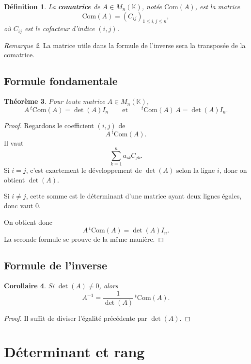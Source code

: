 \documentclass[11pt,a4paper]{article}
\newtheorem{definition}{Définition}[section]
\newtheorem{theoreme}[definition]{Théorème}
\newtheorem{corollaire}[definition]{Corollaire}
\theoremstyle{remark}
\newtheorem{remarque}[definition]{Remarque}
\newcommand{\K}{\mathbb{K}}
\begin{document}
\begin{definition}
La \textbf{comatrice} de \(A\in M_n(\K)\), notée \(\mathrm{Com}(A)\), est la matrice
\[
\mathrm{Com}(A)=(C_{ij})_{1\le i,j\le n},
\]
où \(C_{ij}\) est le cofacteur d’indice \((i,j)\).
\end{definition}

\begin{remarque}
La matrice utile dans la formule de l’inverse sera la transposée de la comatrice.
\end{remarque}

\subsection{Formule fondamentale}

\begin{theoreme}
Pour toute matrice \(A\in M_n(\K)\),
\[
A\,{}^t\!\mathrm{Com}(A)=\det(A)I_n
\qquad \text{et} \qquad
{}^t\!\mathrm{Com}(A)\,A=\det(A)I_n.
\]
\end{theoreme}

\begin{proof}
Regardons le coefficient \((i,j)\) de
\[
A\,{}^t\!\mathrm{Com}(A).
\]
Il vaut
\[
\sum_{k=1}^n a_{ik}C_{jk}.
\]
Si \(i=j\), c’est exactement le développement de \(\det(A)\) selon la ligne \(i\), donc on obtient \(\det(A)\).

Si \(i\neq j\), cette somme est le déterminant d’une matrice ayant deux lignes égales, donc vaut \(0\).

On obtient donc
\[
A\,{}^t\!\mathrm{Com}(A)=\det(A)I_n.
\]
La seconde formule se prouve de la même manière.
\end{proof}

\subsection{Formule de l’inverse}

\begin{corollaire}
Si \(\det(A)\neq 0\), alors
\[
A^{-1}=\frac{1}{\det(A)}\,{}^t\!\mathrm{Com}(A).
\]
\end{corollaire}

\begin{proof}
Il suffit de diviser l’égalité précédente par \(\det(A)\).
\end{proof}

\section{Déterminant et rang}
\end{document}
